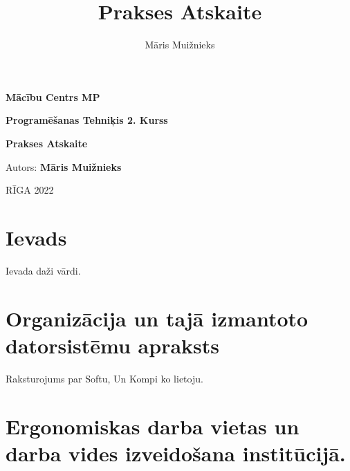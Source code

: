 \documentclass[12pt]{article}
\title{Prakses Atskaite}
\author{Māris Muižnieks}
\begin{document}
	\begin{titlepage}
		\thispagestyle{empty}
		\begin{center}
			\vspace*{2cm}
			\begin{large}\textbf{Mācību Centrs MP}
				
				\textbf{Programēšanas Tehniķis 2. Kurss}
				
				\vfill
				\textbf{Prakses Atskaite}
			\end{large}
			
			\vfill
			
		\end{center}
		\vspace{4cm}
		\begin{flushright}
			Autors: \textbf{Māris Muižnieks}
			
		\end{flushright}
		\vspace{1cm}
		\begin{center}
			RĪGA 2022
		\end{center}
	\end{titlepage}
	\tableofcontents
	\pagebreak
	
	\section{Ievads}
	Ievada daži vārdi.
	
	
	\section{Organizācija un tajā izmantoto datorsistēmu apraksts}
	Raksturojums par Softu, Un Kompi ko lietoju.
	
	
	\section{Ergonomiskas darba vietas un darba vides izveidošana institūcijā.}
	
\end{document}
